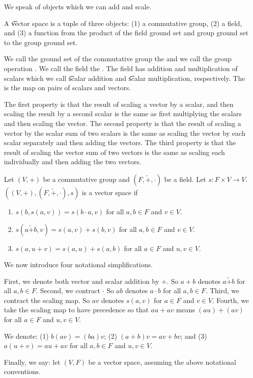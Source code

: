 

We speak of objects which we can add and scale.


A \t{vector space} is a tuple of three objects:
(1) a commutative group, (2) a field, and (3) a function from the product of the field ground set and group ground set to the group ground set.

We call the ground set of the commutative group the  and we call the group operation .
We call the field the .
The field has addition and multiplication of scalars which we call \t{scalar addition} and \t{scalar multiplication}, respectively.
The
is the map on
pairs of scalars and vectors.

The first property is that
the result of scaling a
vector by a scalar, and then
scaling the result by a
second scalar is the same
as first multiplying the
scalars and then scaling
the vector.
The second property is that
the result of
scaling a vector
by the scalar sum of two
scalars is the same
as scaling the vector
by each scalar separately
and then adding the vectors.
The third property is that
the result
of scaling the vector sum
of two vectors is the
same as scaling each
individually and then adding
the two vectors.


Let $(V,+)$ be a commutative
group and $(F, \tilde{+}, \cdot)$
be a field.
Let $s: F \times V \to V$.
$((V, +), (F, \tilde{+}, \cdot), s)$
is a vector space if
\begin{enumerate}
  \item $s(b,s(a, v)) = s(b \cdot a, v)$ for all $a, b \in F$ and $v \in V$.
  \item $s(a\tilde{+}b, v) = s(a, v) + s(b, v)$ for all $a, b \in F$ and $v \in V$.
  \item $s(a, u + v) = s(a,u) + s(a, b)$ for all $a \in F$ and $u, v \in V$.
\end{enumerate}

We now introduce four notational
simplifications.

First, we denote both vector
and scalar addition by $+$.
So $a + b$ denotes $a \tilde{+} b$
for all $a, b \in F$.
Second,
we contract $\cdot$
So $ab$ denotes $a \cdot b$
for all $a, b \in F$.
Third, we
contract the scaling map.
So $av$ denotes $s(a, v)$
for $a \in F$ and $v \in V$.
Fourth,
we take the scaling
map to have precedence so that
$au + av$ means $(au) + (av)$
for all $a \in F$ and $u,v \in V$.

We denote:
(1)
$b(av) = (ba)v$;
(2)
$(a+b)v = av + bv$;
and (3)
$a(u + v) = au + av$
for all
$a,b \in F$ and $u, v \in V$.

Finally, we say: let $(V, F)$
be a vector space, assuming the
above notational conventions.
